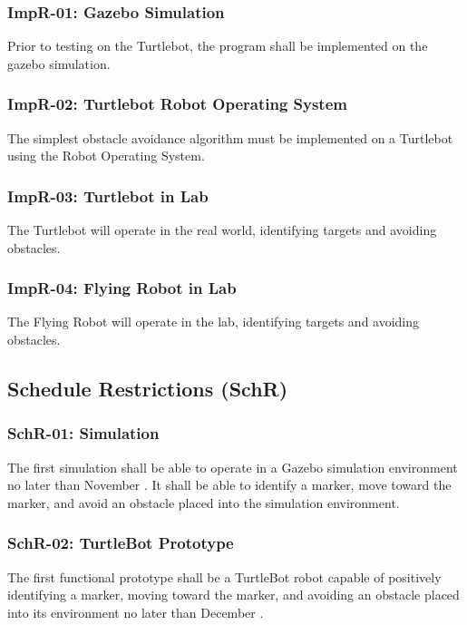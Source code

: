 \documentclass{article}
\begin{document}
		\subsubsection{ImpR-01: Gazebo Simulation}
		
		Prior to testing on the Turtlebot, the program shall be implemented on the gazebo simulation.
		
		\subsubsection{ImpR-02: Turtlebot Robot Operating System}
		
		The simplest obstacle avoidance algorithm must be implemented on a Turtlebot using the Robot Operating System.
		
		\subsubsection{ImpR-03: Turtlebot in Lab}
		
		The Turtlebot will operate in the real world, identifying targets and avoiding obstacles. 
		
		\subsubsection{ImpR-04: Flying Robot in Lab}
		
		The Flying Robot will operate in the lab, identifying targets and avoiding obstacles.
		
	\subsection{Schedule Restrictions (SchR)}
	
		\subsubsection{SchR-01: Simulation}
		
		The first simulation shall be able to operate in a Gazebo simulation environment no later than November . It shall be able to identify a marker, move toward the marker, and avoid an obstacle placed into the simulation environment.
		
		\subsubsection{SchR-02: TurtleBot Prototype}
		
		The first functional prototype shall be a TurtleBot robot capable of positively identifying a marker, moving toward the marker, and avoiding an obstacle placed into its environment no later than December .
		
\end{document}
